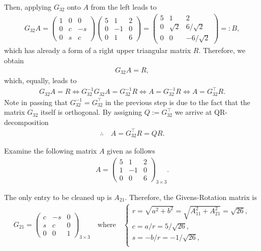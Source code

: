 \documentclass[12pt]{article}
\begin{document}
Then, applying $G_{32}$ onto $A$ from the left leads to 
\begin{align}
	G_{32}A = 
	\begin{pmatrix}  1 &0 &0 \\ 0 &c &-s \\ 0 &s &c \end{pmatrix}
	\begin{pmatrix} 5 &1 &2 \\ 0 &-1 &0 \\ 0 &1 &6 \end{pmatrix}
	= \begin{pmatrix} 5 &1 &2 \\ 0 &\sqrt{2} &6/\sqrt{2} \\ 0 &0 &-6/\sqrt{2} \end{pmatrix}=:B,
\end{align}
which has already a form of a right upper triangular matrix $R$. Therefore, we obtain
\begin{align}
	G_{32}A = R,
\end{align}
which, equally, leads to 
\begin{align}
	G_{32}A = R 
	\Leftrightarrow
	G_{32}^{-1}G_{32}A = G_{32}^{-1}R
	\Leftrightarrow
	A = G_{32}^{-1}R
	\Leftrightarrow
	A = G_{32}^{\top}R.
\end{align}
Note in passing that $G_{32}^{-1} = G_{32}^{\top}$ in the previous step is due to the fact 
that the matrix $G_{32}$ itself is orthogonal. 
By assigning $Q:=G_{32}^{\top}$ we arrive at QR-decomposition
\begin{align*}
	\therefore\quad\boxed{
		A = G_{32}^{\top}R = QR.
	}
\end{align*}

\clearpage
\begin{exampleboxed}
	Examine the following matrix $A$ given as follows
	\begin{align}
		A = \begin{pmatrix} 5 &1 &2 \\ 1 &-1 &0 \\ 0 &0 &6 \end{pmatrix}_{3\times 3}.
	\end{align}
\end{exampleboxed}
The only entry to be cleaned up is $A_{21}$. Therefore, the Givens-Rotation matrix is 
\begin{align}
	G_{21} = \begin{pmatrix}  c &-s &0 \\ s &c &0 \\ 0 &0 &1 \end{pmatrix}_{3\times 3}
	\quad
	\text{where}
	\quad
	\begin{cases}
		r = \sqrt{a^2+b^2} = \sqrt{A_{11}^2 + A_{21}^2} = \sqrt{26}, \\
		c =  a/r = 5/\sqrt{26},                                      \\
		s = -b/r = -1/\sqrt{26},                                     \\
	\end{cases}
\end{align}
\end{document}
